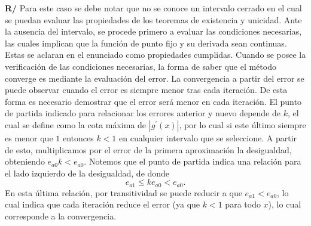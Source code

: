 \documentclass[12pt]{article}
\begin{document}
\begin{enumerate}[leftmargin=*,widest=9]
\textbf{R/} Para este caso se debe notar que no se conoce un intervalo cerrado en el cual se puedan evaluar las propiedades de los teoremas de existencia y unicidad. Ante la ausencia del intervalo, se procede primero a evaluar las condiciones necesarias, las cuales implican que la función de punto fijo y su derivada sean continuas. Estas se aclaran en el enunciado como propiedades cumplidas.
Cuando se posee la verificación de las condiciones necesarias, la forma de saber que el método converge es mediante la evaluación del error. La convergencia a partir del error se puede observar cuando el error es siempre menor tras cada iteración. De esta forma es necesario demostrar que el error será menor en cada iteración.
El punto de partida indicado para relacionar los errores anterior y nuevo depende de \(k\), el cual se define como la cota máxima de \(|g^{\prime}(x)|\), por lo cual si este último siempre es menor que \(1\) entonces \(k<1\) en cualquier intervalo que se seleccione. A partir de esto, multiplicamos por el error de la primera aproximación la desigualdad, obteniendo \(e_{a0}k < e_{a0}\). Notemos que el punto de partida indica una relación para el lado izquierdo de la desigualdad, de donde
\[ e_{a1} \leq ke_{a0} < e_{a0}.\]
En esta última relación, por transitividad se puede reducir a que \(e_{a1}<e_{a0}\), lo cual indica que cada iteración reduce el error (ya que \(k<1\) para todo \(x\)), lo cual corresponde a la convergencia.
\end{enumerate}
\end{document}
